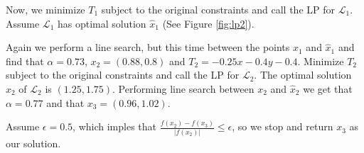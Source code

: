 

Now, we minimize $T_1$ subject to the original constraints and call the LP for
$\mathcal{L}_1$.
Assume $\mathcal{L}_1$ has optimal solution $\hat{x}_1$
(See Figure \ref{fig:lp2}).



Again we perform a line search, but this time between the points $x_1$ and
$\hat{x}_1$ and find that $\alpha = 0.73$, $x_2 = (0.88, 0.8)$ and
$T_2 = -0.25x -0.4y -0.4$.
Minimize $T_2$ subject to the original constraints and call the LP for
$\mathcal{L}_2$.
The optimal solution $\hat{x}_2$ of $\mathcal{L}_2$ is $(1.25, 1.75)$.
Performing line search between $x_2$ and $\hat{x}_2$ we get that
$\alpha = 0.77$ and that $x_3 = (0.96, 1.02)$.



Assume $\epsilon = 0.5$, which imples that
$\frac{f(x_2) - f(x_3)}{|f(x_2)|} \leq \epsilon$, so we stop and return $x_3$
as our solution.
